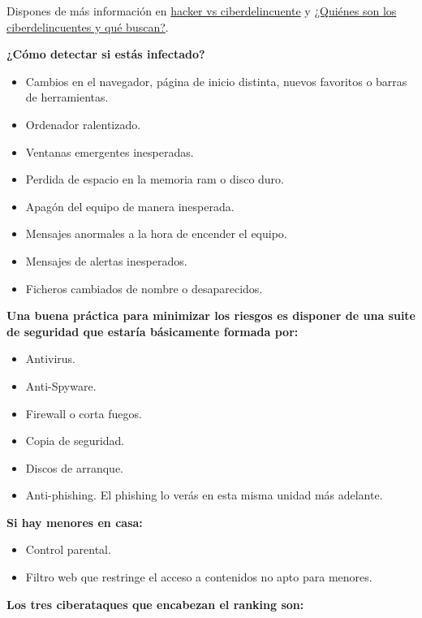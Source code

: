 \documentclass[
  spanish,
  a4paper,
  openany]{book}
\begin{document}
Dispones de más información en \href{https://www.incibe.es/aprendeciberseguridad/hacker-vs-ciberdelincuente}{hacker vs ciberdelincuente} y \href{https://www.osi.es/es/campanas/los-ciberdelincuentes-quienes-son/quienes-son-los-ciberdelincuentes-y-que-buscan}{¿Quiénes son los ciberdelincuentes y qué buscan?}.

\textbf{¿Cómo detectar si estás infectado?}

\begin{itemize}
\item
  Cambios en el navegador, página de inicio distinta, nuevos favoritos o barras de herramientas.
\item
  Ordenador ralentizado.
\item
  Ventanas emergentes inesperadas.
\item
  Perdida de espacio en la memoria ram o disco duro.
\item
  Apagón del equipo de manera inesperada.
\item
  Mensajes anormales a la hora de encender el equipo.
\item
  Mensajes de alertas inesperados.
\item
  Ficheros cambiados de nombre o desaparecidos.
\end{itemize}

\textbf{Una buena práctica para minimizar los riesgos es disponer de una suite de seguridad que estaría básicamente formada por:}

\begin{itemize}
\item
  Antivirus.
\item
  Anti-Spyware.
\item
  Firewall o corta fuegos.
\item
  Copia de seguridad.
\item
  Discos de arranque.
\item
  Anti-phishing. El phishing lo verás en esta misma unidad más adelante.
\end{itemize}

\textbf{Si hay menores en casa:}

\begin{itemize}
\item
  Control parental.
\item
  Filtro web que restringe el acceso a contenidos no apto para menores.
\end{itemize}

\textbf{Los tres ciberataques que encabezan el ranking son:}
\end{document}
